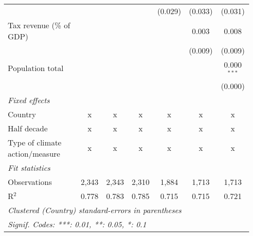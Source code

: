 \begin{tabular}{lcccccc}
                                                               &         &               &               & (0.029)       & (0.033)       & (0.031)\\   
   Tax revenue (\% of GDP)                                     &         &               &               &               & 0.003         & 0.008\\   
                                                               &         &               &               &               & (0.009)       & (0.009)\\   
   Population total                                            &         &               &               &               &               & 0.000$^{***}$\\   
                                                               &         &               &               &               &               & (0.000)\\   
   \emph{Fixed effects}\\
   Country                                                     & x       & x             & x             & x             & x             & x\\  
   Half decade                                                 & x       & x             & x             & x             & x             & x\\  
   Type of climate action/measure                              & x       & x             & x             & x             & x             & x\\  
   \midrule \emph{Fit statistics}\\
   Observations                                                & 2,343   & 2,343         & 2,310         & 1,884         & 1,713         & 1,713\\  
   R$^2$                                                       & 0.778   & 0.783         & 0.785         & 0.715         & 0.715         & 0.721\\  
   \midrule
   \multicolumn{7}{l}{\emph{Clustered (Country) standard-errors in parentheses}}\\
   \multicolumn{7}{l}{\emph{Signif. Codes: ***: 0.01, **: 0.05, *: 0.1}}\\
\end{tabular}
\par\endgroup


